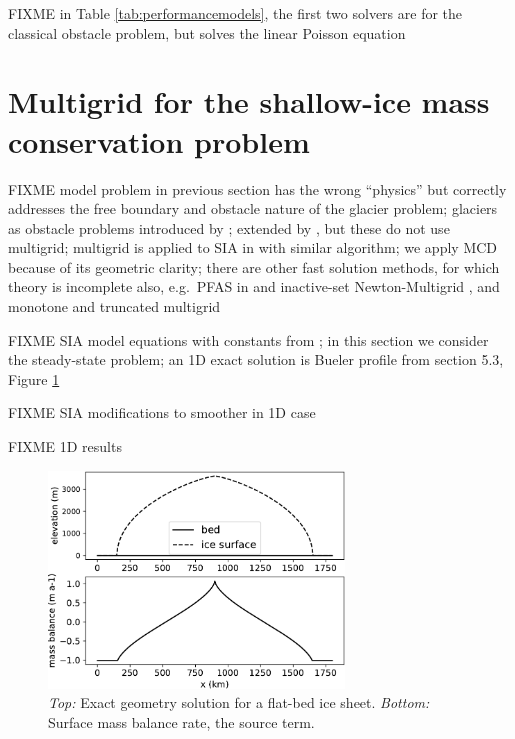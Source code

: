 \documentclass[letterpaper,final,12pt,reqno]{amsart}
\theoremstyle{claim}
\numberwithin{equation}{section}
\numberwithin{figure}{section}
\numberwithin{table}{section}
\numberwithin{theorem}{section}
\begin{document}
FIXME in Table \ref{tab:performancemodels}, the first two solvers are for the classical obstacle problem, but  solves the linear Poisson equation


\section{Multigrid for the shallow-ice mass conservation problem} \label{sec:sia}

FIXME model problem in previous section has the wrong ``physics'' but correctly addresses the free boundary and obstacle nature of the glacier problem; glaciers as obstacle problems introduced by \cite{Calvoetal2002}; extended by \cite{Bueler2016,Bueler2020,JouvetBueler2012}, but these do not use multigrid; multigrid is applied to SIA in \cite{Jouvetetal2013,JouvetGraeser2013} with similar algorithm; we apply MCD because of its geometric clarity; there are other fast solution methods, for which theory is incomplete also, e.g.~PFAS in \cite{BrandtCryer1983} and inactive-set Newton-Multigrid \cite[Chapter 12]{Bueler2021}, and monotone and truncated multigrid \cite{GraeserKornhuber2009}

FIXME SIA model equations \cite{Bueler2016} with constants from \cite{Huybrechtsetal1996}; in this section we consider the steady-state problem; an 1D exact solution is Bueler profile from \cite{vanderVeen2013} section 5.3, Figure \ref{fig:siadatafigure}

FIXME SIA modifications to smoother in 1D case

FIXME 1D results

\begin{figure}
\includegraphics[width=0.7\textwidth]{fixfigs/siadatafigure.pdf}
\caption{\emph{Top:} Exact geometry solution for a flat-bed ice sheet.  \emph{Bottom:} Surface mass balance rate, the source term.}
\label{fig:siadatafigure}
\end{figure}
\end{document}
